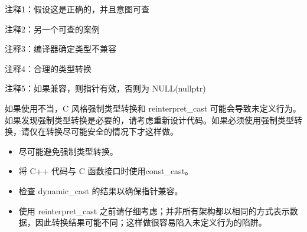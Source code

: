 {\footnotesize
注释1：假设这是正确的，并且意图可查

注释2：另一个可查的案例

注释3：编译器确定类型不兼容

注释4：合理的类型转换

注释5：如果兼容，则指针有效，否则为 NULL(nullptr)
}

如果使用不当，C 风格强制类型转换和 reinterpret\_cast 可能会导致未定义行为。如果发现强制类型转换是必要的，请考虑重新设计代码。如果必须使用强制类型转换，请仅在转换尽可能安全的情况下才这样做。


\begin{itemize}
\item
尽可能避免强制类型转换。

\item
将 C++ 代码与 C 函数接口时使用const\_cast。

\item
检查 dynamic\_cast 的结果以确保指针兼容。

\item
使用 reinterpret\_cast 之前请仔细考虑；并非所有架构都以相同的方式表示数据，因此转换结果可能不同；这样做很容易陷入未定义行为的陷阱。
\end{itemize}






